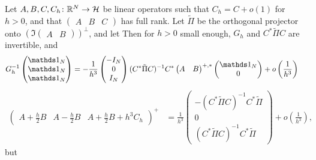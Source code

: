 \begin{lem}\label{lem-apx-cbpdl}
Let $A,B,C,C_h\colon \mathbb{R}^N\rightarrow \mathcal{H}$ be linear operators such that $C_h=C +o(1)$ for $h>0$, and that $\begin{pmatrix}
    A & B & C
  \end{pmatrix}$ has full rank. Let $\tilde{\Pi}$ be the orthogonal projector onto $(\Im \begin{pmatrix}A&B\end{pmatrix})^\perp$, and let 
  Then for $h>0$ small enough, $G_h$ and $C^*\tilde{\Pi} C$ are invertible, and
\begin{align*}
 	G_h^{-1}\begin{pmatrix}\bun_N\\\bun_N\\\bun_N\end{pmatrix} 
	&= -\frac{1}{h^3}\begin{pmatrix} -I_N\\0\\I_N\end{pmatrix} (C^*\tilde{\Pi} C)^{-1}C^*\begin{pmatrix} A& B\end{pmatrix}^{+,*} \begin{pmatrix} \bun_N\\0\end{pmatrix} +o\left(\frac{1}{h^3}\right)
\end{align*}
\begin{align*}	
\begin{pmatrix}
 A+\frac{h}{2}B & A-\frac{h}{2}B & A+\frac{h}{2}B+h^3 C_h
\end{pmatrix}^+&= \frac{1}{h^3}  \begin{pmatrix}
    -(C^*\tilde{\Pi} C)^{-1}C^*\tilde{\Pi} \\ 0 \\(C^*\tilde{\Pi} C)^{-1}C^*\tilde{\Pi} 
    \end{pmatrix}+ o\left(\frac{1}{h^3}\right),
  \end{align*}
  but
\begin{align*}

\end{align*}
\end{lem}

